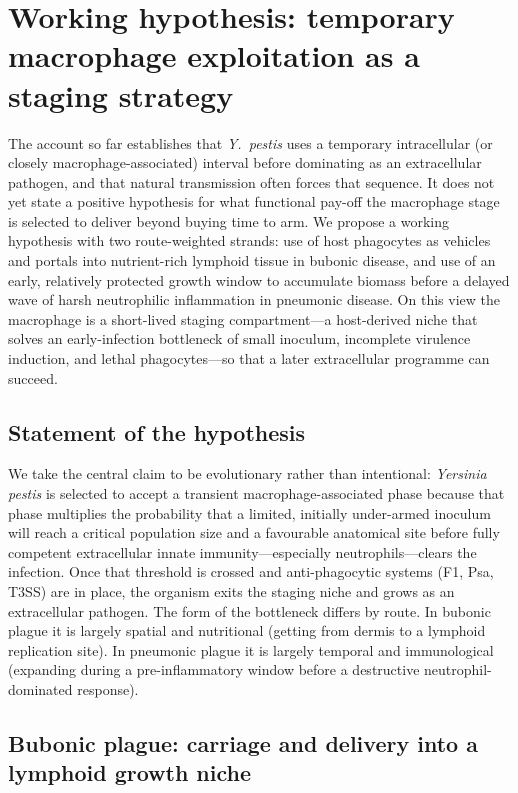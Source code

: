 \documentclass[11pt,a4paper]{article}
\begin{document}
\section{Working hypothesis: temporary macrophage exploitation as a staging strategy}

The account so far establishes that \textit{Y.\ pestis} uses a temporary intracellular (or closely macrophage-associated) interval before dominating as an extracellular pathogen, and that natural transmission often forces that sequence. It does not yet state a positive hypothesis for what functional pay-off the macrophage stage is selected to deliver beyond buying time to arm. We propose a working hypothesis with two route-weighted strands: use of host phagocytes as vehicles and portals into nutrient-rich lymphoid tissue in bubonic disease, and use of an early, relatively protected growth window to accumulate biomass before a delayed wave of harsh neutrophilic inflammation in pneumonic disease. On this view the macrophage is a short-lived staging compartment---a host-derived niche that solves an early-infection bottleneck of small inoculum, incomplete virulence induction, and lethal phagocytes---so that a later extracellular programme can succeed.

\subsection{Statement of the hypothesis}

We take the central claim to be evolutionary rather than intentional: \textit{Yersinia pestis} is selected to accept a transient macrophage-associated phase because that phase multiplies the probability that a limited, initially under-armed inoculum will reach a critical population size and a favourable anatomical site before fully competent extracellular innate immunity---especially neutrophils---clears the infection. Once that threshold is crossed and anti-phagocytic systems (F1, Psa, T3SS) are in place, the organism exits the staging niche and grows as an extracellular pathogen. The form of the bottleneck differs by route. In bubonic plague it is largely spatial and nutritional (getting from dermis to a lymphoid replication site). In pneumonic plague it is largely temporal and immunological (expanding during a pre-inflammatory window before a destructive neutrophil-dominated response).

\subsection{Bubonic plague: carriage and delivery into a lymphoid growth niche}
\end{document}
